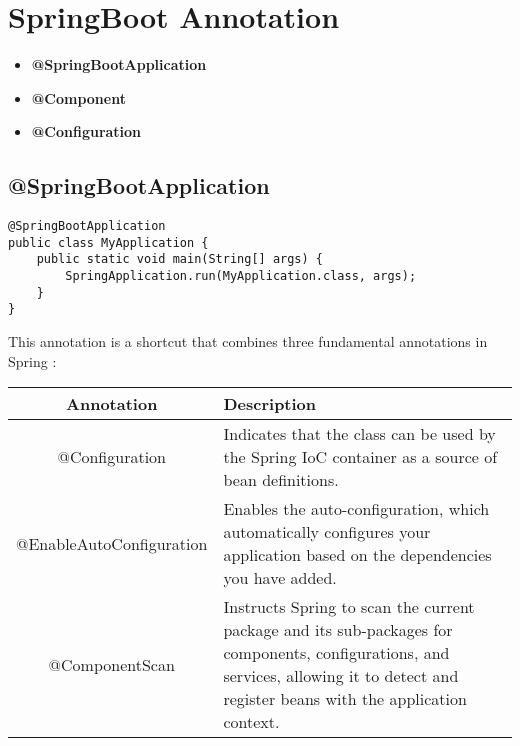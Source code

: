 \documentclass[a4paper, 12pt]{article}
\begin{document}
    \section{SpringBoot Annotation}
    \begin{itemize}
        \item \textbf{@SpringBootApplication}
        \item \textbf{@Component}
        \item \textbf{@Configuration}
    \end{itemize}

    \subsection{@SpringBootApplication}
    \begin{lstlisting}
@SpringBootApplication
public class MyApplication {
    public static void main(String[] args) {
        SpringApplication.run(MyApplication.class, args);
    }
}
    \end{lstlisting}
    This annotation is a shortcut that combines three fundamental annotations in Spring :

    \begin{table}[h]
        \centering
        \begin{tabular}{|c|p{10cm}|}
            \hline
            Annotation               & Description                                                                                                                                                                            \\ \hline
            @Configuration           & Indicates that the class can be used by the Spring IoC container as a source of bean definitions.                                                                                      \\ \hline
            @EnableAutoConfiguration & Enables the auto-configuration, which automatically configures your application based on the dependencies you have added.                                                              \\ \hline
            @ComponentScan           & Instructs Spring to scan the current package and its sub-packages for components, configurations, and services, allowing it to detect and register beans with the application context. \\ \hline
        \end{tabular}
        \label{tab:Annotation}
    \end{table}
\end{document}
